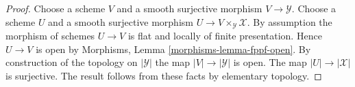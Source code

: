 \documentclass[10pt,a4paper]{amsart}
\theoremstyle{plain}
\theoremstyle{definition}
\theoremstyle{remark}
\numberwithin{equation}{subsection}
\begin{document}
\begin{proof}
Choose a scheme $V$ and a smooth surjective morphism $V \to \mathcal{Y}$.
Choose a scheme $U$ and a smooth surjective morphism
$U \to V \times_\mathcal{Y} \mathcal{X}$. By assumption the morphism
of schemes $U \to V$ is flat and locally of finite presentation.
Hence $U \to V$ is open by
Morphisms, Lemma \ref{morphisms-lemma-fppf-open}.
By construction of the topology on $|\mathcal{Y}|$ the map
$|V| \to |\mathcal{Y}|$ is open.
The map $|U| \to |\mathcal{X}|$ is surjective.
The result follows from these facts by elementary topology.
\end{proof}
\end{document}
